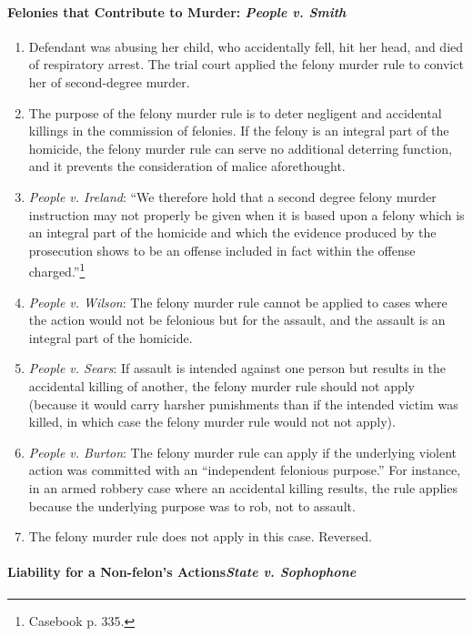 \paragraph{Felonies that Contribute to Murder: \emph{People v. Smith}}

\begin{enumerate}
    \item Defendant was abusing her child, who accidentally fell, hit her head, and died of respiratory arrest. The trial court applied the felony murder rule to convict her of second-degree murder.
    \item The purpose of the felony murder rule is to deter negligent and accidental killings in the commission of felonies. If the felony is an integral part of the homicide, the felony murder rule can serve no additional deterring function, and it prevents the consideration of malice aforethought.
    \item \emph{People v. Ireland}: ``We therefore hold that a second degree felony murder instruction may not properly be given when it is based upon a felony which is an integral part of the homicide and which the evidence produced by the prosecution shows to be an offense included in fact within the offense charged.''\footnote{Casebook p. 335.}
    \item \emph{People v. Wilson}: The felony murder rule cannot be applied to cases where the action would not be felonious but for the assault, and the assault is an integral part of the homicide.
    \item \emph{People v. Sears}: If assault is intended against one person but results in the accidental killing of another, the felony murder rule should not apply (because it would carry harsher punishments than if the intended victim was killed, in which case the felony murder rule would not not apply).
    \item \emph{People v. Burton}: The felony murder rule can apply if the underlying violent action was committed with an ``independent felonious purpose.'' For instance, in an armed robbery case where an accidental killing results, the rule applies because the underlying purpose was to rob, not to assault.
    \item The felony murder rule does not apply in this case. Reversed.
\end{enumerate}

\paragraph{Liability for a Non-felon's Actions\emph{State v. Sophophone}}

